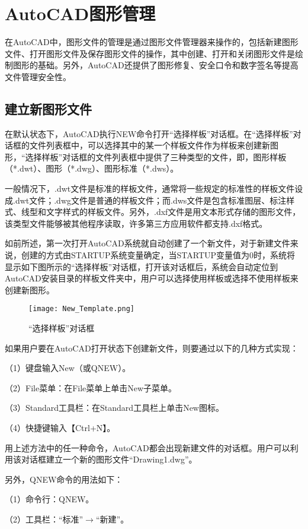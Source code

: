 \part{AutoCAD图形管理}

在AutoCAD中，图形文件的管理是通过图形文件管理器来操作的，包括新建图形文件、打开图形文件及保存图形文件的操作，其中创建、打开和关闭图形文件是绘制图形的基础。另外，AutoCAD还提供了图形修复、安全口令和数字签名等提高文件管理安全性。

\chapter{建立新图形文件}

在默认状态下，AutoCAD执行NEW命令打开“选择样板”对话框。在“选择样板”对话框的文件列表框中，可以选择其中的某一个样板文件作为样板来创建新图形，“选择样板”对话框的文件列表框中提供了三种类型的文件，即，图形样板（*.dwt）、图形（*.dwg）、图形标准（*.dws）。

一般情况下，.dwt文件是标准的样板文件，通常将一些规定的标准性的样板文件设成.dwt文件；.dwg文件是普通的样板文件；而.dws文件是包含标准图层、标注样式、线型和文字样式的样板文件。另外，.dxf文件是用文本形式存储的图形文件，该类型文件能够被其他程序读取，许多第三方应用软件都支持.dxf格式。

如前所述，第一次打开AutoCAD系统就自动创建了一个新文件，对于新建文件来说，创建的方式由STARTUP系统变量确定，当STARTUP变量值为0时，系统将显示如下图所示的“选择样板”对话框，打开该对话框后，系统会自动定位到AutoCAD安装目录的样板文件夹中，用户可以选择使用样板或选择不使用样板来创建新图形。

\begin{figure}[htbp]
\centering
\texttt{[image: New\_Template.png]}
\caption{“选择样板”对话框}
\end{figure}

如果用户要在AutoCAD打开状态下创建新文件，则要通过以下的几种方式实现：

（1）键盘输入New（或QNEW）。

（2）File菜单：在File菜单上单击New子菜单。

（3）Standard工具栏：在Standard工具栏上单击New图标。

（4）快捷键输入【Ctrl+N】。

用上述方法中的任一种命令，AutoCAD都会出现新建文件的对话框。用户可以利用该对话框建立一个新的图形文件“Drawing1.dwg”。

另外，QNEW命令的用法如下：

（1）命令行：QNEW。

（2）工具栏：“标准”$\to$“新建”。

